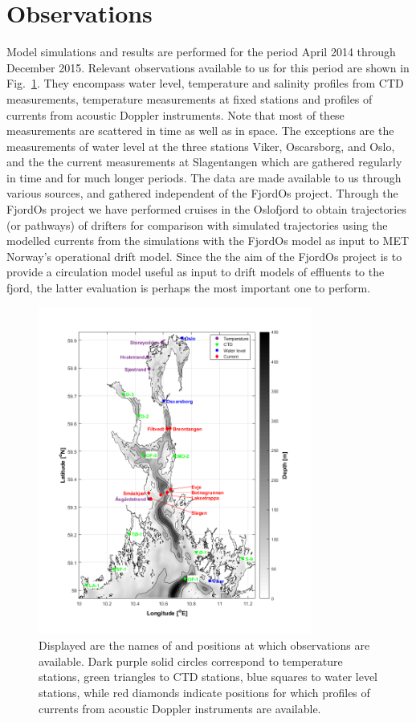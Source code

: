 \section{Observations}

Model simulations and results are performed for the period April 2014 through December 2015. Relevant observations available to us for this period are shown in Fig.~\ref{fig:kart_obs}. They encompass water level, temperature and salinity profiles from CTD measurements, temperature measurements at fixed stations and profiles of currents from acoustic Doppler instruments. Note that most of these measurements are scattered in time as well as in space. The exceptions are the measurements of water level at the three stations Viker, Oscarsborg, and Oslo, and the the current measurements at Slagentangen which are gathered regularly in time and for much longer periods. The data are made available to us through various sources, and gathered independent of the FjordOs project. Through the FjordOs project we have performed cruises in the Oslofjord to obtain trajectories (or pathways) of drifters for comparison with simulated trajectories using the modelled currents from the simulations with the FjordOs model as input to MET Norway's operational drift model. Since the the aim of the FjordOs project is to provide a circulation model useful as input to drift models of effluents to the fjord, the latter evaluation is perhaps the most important one to perform.

\begin{figure}[htb]
\centerline{
\includegraphics*[trim=0cm 0.8cm 0cm 0cm,clip=true,width=0.8\textwidth]{Figurer/kart_obs}
}
\caption{\small
Displayed are the names of and positions at which observations are available. Dark purple solid circles correspond to temperature stations, green triangles to CTD stations, blue squares to water level stations, while red diamonds indicate positions for which profiles of currents from acoustic Doppler instruments are available.
}
\label{fig:kart_obs}
\end{figure}

